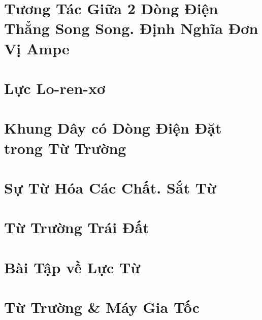 \documentclass[oneside]{book}
\numberwithin{equation}{section}
\begin{document}

\section{Tương Tác Giữa 2 Dòng Điện Thẳng Song Song. Định Nghĩa Đơn Vị Ampe}


\section{Lực Lo-ren-xơ}


\section{Khung Dây có Dòng Điện Đặt trong Từ Trường}


\section{Sự Từ Hóa Các Chất. Sắt Từ}


\section{Từ Trường Trái Đất}


\section{Bài Tập về Lực Từ}


\section{Từ Trường \& Máy Gia Tốc}

\end{document}
